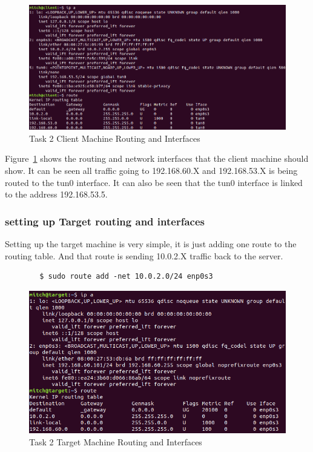 \documentclass[12pt]{article}
\newcommand\tab[1][0.5cm]{\hspace*{#1}}
\begin{document}
    \begin{figure}[H]
        \begin{center}
            \includegraphics[scale=0.45]{t2_client_routing.png}
        \end{center}{}
        \caption{Task 2 Client Machine Routing and Interfaces}
        \label{fig:t2_client_routing}
    \end{figure}
    
    \tab Figure~\ref{fig:t2_client_routing} shows the routing and network interfaces that the client machine should show. It can be seen all traffic going to 192.168.60.X and 192.168.53.X is being routed to the tun0 interface. It can also be seen that the tun0 interface is linked to the address 192.168.53.5.
    
    
\subsubsection{setting up Target routing and interfaces}
    Setting up the target machine is very simple, it is just adding one route to the routing table. And that route is sending 10.0.2.X traffic back to the server.
    \begin{verbatim}
        $ sudo route add -net 10.0.2.0/24 enp0s3    
    \end{verbatim}

    \begin{figure}[H]
        \begin{center}
            \includegraphics[scale=0.45]{t2_target_routing.png}
        \end{center}{}
        \caption{Task 2 Target Machine Routing and Interfaces}
        \label{fig:t2_target_routing}
    \end{figure}
    
\end{document}
